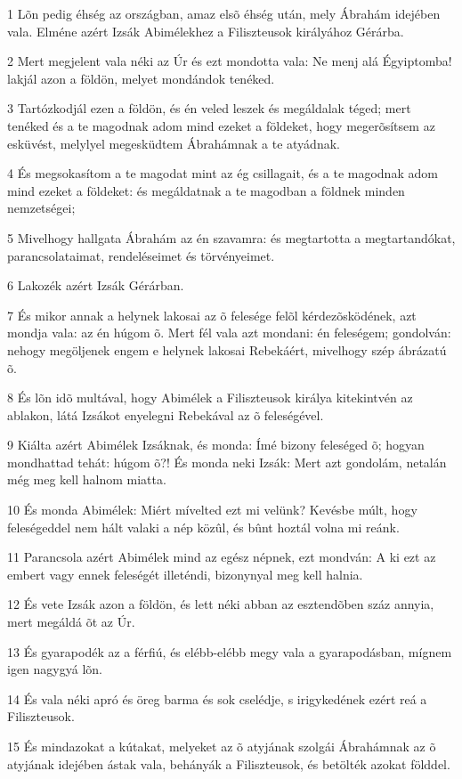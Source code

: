 \par 1 Lõn pedig éhség az országban, amaz elsõ éhség után, mely Ábrahám idejében vala. Elméne azért Izsák Abimélekhez a Filiszteusok királyához Gérárba.
\par 2 Mert megjelent vala néki az Úr és ezt mondotta vala: Ne menj alá Égyiptomba! lakjál azon a földön, melyet mondándok tenéked.
\par 3 Tartózkodjál ezen a földön, és én veled leszek és megáldalak téged; mert tenéked és a te magodnak adom mind ezeket a földeket, hogy megerõsítsem az esküvést, melylyel megesküdtem Ábrahámnak a te atyádnak.
\par 4 És megsokasítom a te magodat mint az ég csillagait, és a te magodnak adom mind ezeket a földeket: és megáldatnak a te magodban a földnek minden nemzetségei;
\par 5 Mivelhogy hallgata Ábrahám az én szavamra: és megtartotta a megtartandókat, parancsolataimat, rendeléseimet és törvényeimet.
\par 6 Lakozék azért Izsák Gérárban.
\par 7 És mikor annak a helynek lakosai az õ felesége felõl kérdezõsködének, azt mondja vala: az én húgom õ. Mert fél vala azt mondani: én feleségem; gondolván: nehogy megöljenek engem e helynek lakosai Rebekáért, mivelhogy szép ábrázatú õ.
\par 8 És lõn idõ multával, hogy Abimélek a Filiszteusok királya kitekintvén az ablakon, látá Izsákot enyelegni Rebekával az õ feleségével.
\par 9 Kiálta azért Abimélek Izsáknak, és monda: Ímé bizony feleséged õ; hogyan mondhattad tehát: húgom õ?! És monda neki Izsák: Mert azt gondolám, netalán még meg kell halnom miatta.
\par 10 És monda Abimélek: Miért mívelted ezt mi velünk? Kevésbe múlt, hogy feleségeddel nem hált valaki a nép közûl, és bûnt hoztál volna mi reánk.
\par 11 Parancsola azért Abimélek mind az egész népnek, ezt mondván: A ki ezt az embert vagy ennek feleségét illeténdi, bizonynyal meg kell halnia.
\par 12 És vete Izsák azon a földön, és lett néki abban az esztendõben száz annyia, mert megáldá õt az Úr.
\par 13 És gyarapodék az a férfiú, és elébb-elébb megy vala a gyarapodásban, mígnem igen nagygyá lõn.
\par 14 És vala néki apró és öreg barma és sok cselédje, s irigykedének ezért reá a Filiszteusok.
\par 15 És mindazokat a kútakat, melyeket az õ atyjának szolgái Ábrahámnak az õ atyjának idejében ástak vala, behányák a Filiszteusok, és betölték azokat földdel.

